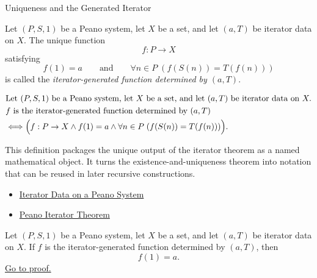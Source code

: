 \begin{topicbox}{Uniqueness and the Generated Iterator}
\begin{tcolorbox}[colback=defbox, colframe=defborder, arc=2pt,
  left=6pt, right=6pt, top=4pt, bottom=4pt,
  title={\small\textbf{Definition (Iterator-Generated Function)}},
  fonttitle=\small\bfseries]
\begin{definition}
\label{def:iterator-generated-function}
Let $(P,S,1)$ be a Peano system, let $X$ be a set, and let $(a,T)$ be iterator
data on $X$. The unique function
\[
f : P \to X
\]
satisfying
\[
f(1)=a
\qquad\text{and}\qquad
\forall n \in P\;(f(S(n))=T(f(n)))
\]
is called the \emph{iterator-generated function determined by $(a,T)$}.
\end{definition}
\end{tcolorbox}

\begin{remark*}
\[
\begin{aligned}
&\text{Let } (P,S,1) \text{ be a Peano system, let } X \text{ be a set, and let } (a,T) \text{ be iterator data on } X.\\
&f \text{ is the iterator-generated function determined by } (a,T)\\
&\Longleftrightarrow
\Bigl(f : P \to X \land f(1)=a \land
\forall n \in P\;(f(S(n))=T(f(n)))\Bigr).
\end{aligned}
\]
\end{remark*}

\begin{remark*}[Interpretation]
This definition packages the unique output of the iterator theorem as a named
mathematical object. It turns the existence-and-uniqueness theorem into
notation that can be reused in later recursive constructions.
\end{remark*}

\begin{remark*}[Dependencies]
\begin{itemize}
  \item \hyperref[def:iterator-data-on-peano-system]{Iterator Data on a Peano System}
  \item \hyperref[thm:peano-iterator-theorem]{Peano Iterator Theorem}
\end{itemize}
\end{remark*}

\begin{tcolorbox}[colback=thmbox, colframe=thmborder, arc=2pt,
  left=6pt, right=6pt, top=4pt, bottom=4pt,
  title={\small\textbf{Theorem (Iterator Base Value)}},
  fonttitle=\small\bfseries]
\begin{theorem}
\label{thm:iterator-base-value}
Let $(P,S,1)$ be a Peano system, let $X$ be a set, and let $(a,T)$ be iterator
data on $X$. If $f$ is the iterator-generated function determined by $(a,T)$,
then
\[
f(1)=a.
\]
\hyperref[prf-iterator-base-value]{Go to proof.}
\end{theorem}
\end{tcolorbox}


\end{topicbox}
